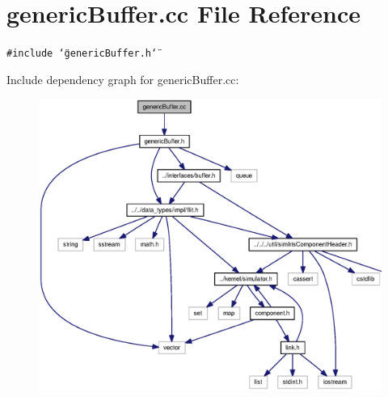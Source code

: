 \section{genericBuffer.cc File Reference}
\label{genericBuffer_8cc}
{\tt \#include \char`\"{}genericBuffer.h\char`\"{}}\par


Include dependency graph for genericBuffer.cc:\nopagebreak
\begin{figure}[H]
\begin{center}
\leavevmode
\includegraphics[width=328pt]{genericBuffer_8cc__incl}
\end{center}
\end{figure}
